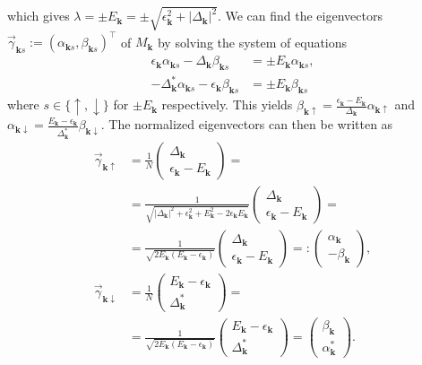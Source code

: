 \documentclass[english, parskip=full]{scrartcl}
\begin{document}
which gives $\lambda = \pm E_{\mathbf{k}} = \pm \sqrt{\epsilon_{\mathbf{k}}^2 + |\Delta_{\mathbf{k}}|^2}$.
We can find the eigenvectors $\vec{\gamma}_{\mathbf{k}s} := (\alpha_{\mathbf{k}s}, \beta_{\mathbf{k}s})^\top$ of $M_{\mathbf{k}}$ by solving the system of equations
\begin{align}
\epsilon_{\mathbf{k}}\alpha_{\mathbf{k}s} - \Delta_{\mathbf{k}}\beta_{\mathbf{k}s} &= \pm E_\textbf{k} \alpha_{\mathbf{k}s},\\
-\Delta_{\mathbf{k}}^\ast\alpha_{\mathbf{k}s} - \epsilon_{\mathbf{k}}\beta_{\mathbf{k}s} &= \pm E_{\mathbf{k}} \beta_{\mathbf{k}s}
\end{align}
where $s\in\{\uparrow, \downarrow\}$ for $\pm E_\textbf{k}$ respectively.
This yields $\beta_{\mathbf{k}\uparrow} = \frac{\epsilon_{\mathbf{k}} - E_{\mathbf{k}}}{\Delta_{\mathbf{k}}}\alpha_{\mathbf{k}\uparrow}$ and $\alpha_{\mathbf{k}\downarrow} = \frac{E_{\mathbf{k}} - \epsilon_{\mathbf{k}}}{\Delta_{\mathbf{k}}^\ast} \beta_{\mathbf{k}\downarrow}$.
The normalized eigenvectors can then be written as
\begin{align}
\vec{\gamma}_{\mathbf{k}\uparrow} &= \frac{1}{N}\begin{pmatrix}
\Delta_{\mathbf{k}} \\ \epsilon_{\mathbf{k}} - E_{\mathbf{k}}
\end{pmatrix} = \\
&= \frac{1}{\sqrt{|\Delta_{\mathbf{k}}|^2 + \epsilon_{\mathbf{k}}^2 + E_{\mathbf{k}}^2 - 2\epsilon_{\mathbf{k}} E_{\mathbf{k}}}} \begin{pmatrix}
\Delta_{\mathbf{k}}  \\ \epsilon_{\mathbf{k}} - E_{\mathbf{k}}
\end{pmatrix} = \\
&= \frac{1}{\sqrt{2E_{\mathbf{k}} (E_{\mathbf{k}} -\epsilon_{\mathbf{k}})}} \begin{pmatrix}
\Delta_{\mathbf{k}} \\ \epsilon_{\mathbf{k}} - E_{\mathbf{k}}
\end{pmatrix} =: \begin{pmatrix}
\alpha_\textbf{k} \\ -\beta_\textbf{k}
\end{pmatrix} , \\
\vec{\gamma}_{\mathbf{k}\downarrow} &= \frac{1}{N}\begin{pmatrix}
E_{\mathbf{k}} - \epsilon_{\mathbf{k}} \\ \Delta_{\mathbf{k}}^\ast
\end{pmatrix} = \\
&= \frac{1}{\sqrt{2E_{\mathbf{k}} (E_{\mathbf{k}} -\epsilon_{\mathbf{k}})}} \begin{pmatrix}
E_{\mathbf{k}} - \epsilon_{\mathbf{k}} \\ \Delta_{\mathbf{k}}^\ast
\end{pmatrix} = \begin{pmatrix}
\beta_\textbf{k} \\ \alpha_\textbf{k}^\ast
\end{pmatrix}.
\end{align}
\end{document}
